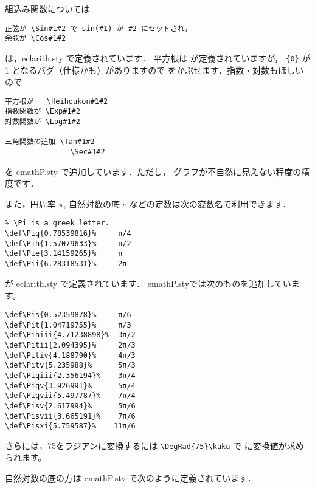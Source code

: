 組込み関数については
\begin{boxnote}
\begin{verbatim}
正弦が \Sin#1#2 で sin(#1) が #2 にセットされ，
余弦が \Cos#1#2
\end{verbatim}
\end{boxnote}
\noindent
は，\textsf{eclarith.sty} で定義されています．
平方根は  が定義されていますが，
\verb+{0}+ が 1 となるバグ（仕様かも）がありますので
 をかぶせます．指数・対数もほしいので
\begin{boxnote}
\begin{verbatim}
平方根が   \Heihoukon#1#2
指数関数が \Exp#1#2
対数関数が \Log#1#2

三角関数の追加 \Tan#1#2
               \Sec#1#2
\end{verbatim}
\end{boxnote}
\noindent
を \textsf{emathP.sty} で追加しています．ただし，
グラフが不自然に見えない程度の精度です．

また，円周率 $\pi$, 自然対数の底 $e$ などの定数は次の変数名で利用できます．

\begin{boxnote}
\begin{verbatim}
% \Pi is a greek letter.
\def\Piq{0.78539816}%     π/4
\def\Pih{1.57079633}%     π/2
\def\Pie{3.14159265}%     π
\def\Pii{6.28318531}%     2π
\end{verbatim}
\end{boxnote}
\noindent
が \textsf{eclarith.sty} で定義されています．
\textsf{emathP.sty}では次のものを追加しています。
\begin{boxnote}
\begin{verbatim}
\def\Pis{0.52359878}%     π/6
\def\Pit{1.04719755}%     π/3
\def\Pihiii{4.71238898}%  3π/2
\def\Pitii{2.094395}%     2π/3
\def\Pitiv{4.188790}%     4π/3
\def\Pitv{5.235988}%      5π/3
\def\Piqiii{2.356194}%    3π/4
\def\Piqv{3.926991}%      5π/4
\def\Piqvii{5.497787}%    7π/4
\def\Pisv{2.617994}%      5π/6
\def\Pisvii{3.665191}%    7π/6
\def\Pisxi{5.759587}%    11π/6
\end{verbatim}
\end{boxnote}
\noindent
さらには，75\Deg をラジアンに変換するには \verb/\DegRad{75}\kaku/ で 
 に変換値が求められます。

自然対数の底の方は \textsf{emathP.sty} で次のように定義されています．

